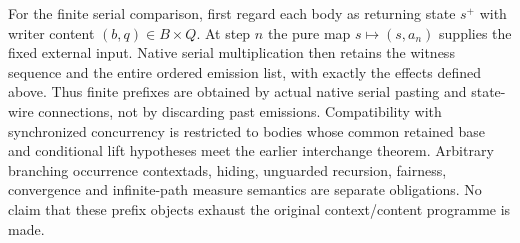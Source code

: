 \documentclass[11pt]{article}
\begin{document}
For the finite serial comparison, first regard each body as returning state $s^+$ with writer content $(b,q)\in B\times Q$. At step $n$ the pure map $s\mapsto(s,a_n)$ supplies the fixed external input. Native serial multiplication then retains the witness sequence and the entire ordered emission list, with exactly the effects defined above. Thus finite prefixes are obtained by actual native serial pasting and state-wire connections, not by discarding past emissions. Compatibility with synchronized concurrency is restricted to bodies whose common retained base and conditional lift hypotheses meet the earlier interchange theorem. Arbitrary branching occurrence contextads, hiding, unguarded recursion, fairness, convergence and infinite-path measure semantics are separate obligations. No claim that these prefix objects exhaust the original context/content programme is made.
\end{document}
